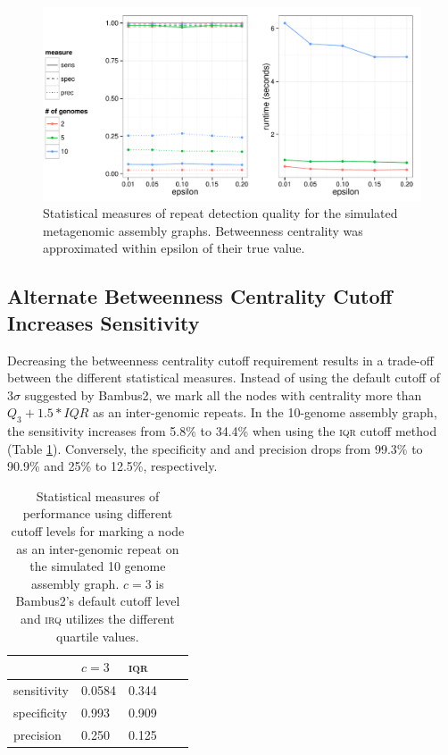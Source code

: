 \documentclass[runningheads,a4paper]{llncs}
\begin{document}
\begin{figure}[htbp]
\centering
\includegraphics[width = \textwidth]{sampled_paths}
\caption{Statistical measures of repeat detection quality for the simulated metagenomic assembly graphs. Betweenness centrality was approximated within epsilon of their true value.}
\label{fig:sampled_paths}
\end{figure}

\subsection*{Alternate Betweenness Centrality Cutoff Increases Sensitivity}

Decreasing the betweenness centrality cutoff requirement results in a trade-off between the different statistical measures.
Instead of using the default cutoff of $3\sigma$ suggested by Bambus2, we mark all the nodes with centrality more than $Q_{3} + 1.5*IQR$ as an inter-genomic repeats.
In the 10-genome assembly graph, the sensitivity increases from 5.8\% to 34.4\% when using the \textsc{iqr} cutoff method (Table \ref{tab:cutoffs}).
Conversely, the specificity and and precision drops from 99.3\% to 90.9\% and 25\% to 12.5\%, respectively.

\begin{table}[h]
\centering
\caption[]{Statistical measures of performance using different cutoff levels for marking a node as an inter-genomic repeat on the simulated 10 genome assembly graph. $c=3$ is Bambus2's default cutoff level and \textsc{irq} utilizes the different quartile values.}
\begin{tabular}{lllll}
 & $c=3$        & \textsc{iqr}   \\
\hline
sensitivity & 0.0584 & 0.344 \\
specificity & 0.993  & 0.909 \\
precision   & 0.250  & 0.125 \\
\hline 
\end{tabular}
\label{tab:cutoffs}
\end{table}
\end{document}
